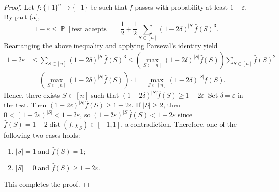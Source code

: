 \documentclass[letterpaper, reqno,11pt]{article}
\newcommand{\PP}{\mathop{{}\mathbb{P}}}
\DeclareMathOperator{\dist}{dist}
\begin{document}
\begin{enumerate}
\begin{enumerate}
    \begin{proof}
      Let $f : \{ \pm 1 \}^n \to \{ \pm 1 \}$ be such that $f$ passes with probability at least $1 - \varepsilon$. By part (a),
      $$ 1 - \varepsilon \leq \PP[\text{test accepts}] = \frac{1}{2} + \frac{1}{2} \sum_{S \subset [n]} (1 - 2\delta)^{|S|} \hat{f}(S)^3. $$
      Rearranging the above inequality and applying Parseval's identity yield
      \begin{align*}
        1 - 2\varepsilon &\leq \sum_{S \subset [n]} (1 - 2\delta)^{|S|} \hat{f}(S)^3 \leq \left(\max_{S \subset [n]} (1 - 2\delta)^{|S|} \hat{f}(S)\right) \sum_{S \subset [n]} \hat{f}(S)^2 \\
        &= \left(\max_{S \subset [n]} (1 - 2\delta)^{|S|} \hat{f}(S)\right) \cdot 1 = \max_{S \subset [n]} (1 - 2\delta)^{|S|} \hat{f}(S).
      \end{align*}
      Hence, there exists $S \subset [n]$ such that $(1 - 2\delta)^{|S|} \hat{f}(S) \geq 1 - 2\varepsilon$. Set $\delta = \varepsilon$ in the test. Then $(1 - 2\varepsilon)^{|S|} \hat{f}(S) \geq 1 - 2\varepsilon$. If $|S| \geq 2$, then $0 < (1 - 2\varepsilon)^{|S|} < 1 - 2\varepsilon$, so $(1 - 2\varepsilon)^{|S|} \hat{f}(S) < 1 - 2\varepsilon$ since $\hat{f}(S) = 1 - 2\dist(f, \chi_S) \in [-1, 1]$, a contradiction. Therefore, one of the following two cases holds:
      \begin{enumerate}[label=(\roman*), itemsep=0pt]
        \item $|S| = 1$ and $\hat{f}(S) = 1$;
        \item $|S| = 0$ and $\hat{f}(S) \geq 1 - 2\varepsilon$.
      \end{enumerate}
      This completes the proof.
    \end{proof}
  \end{enumerate}
\end{enumerate}
\end{document}
